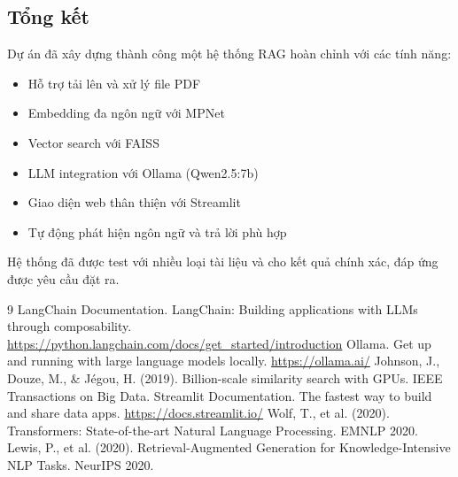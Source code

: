 \documentclass[a4paper]{article}
\begin{document}
\subsection{ Tổng kết}
Dự án đã xây dựng thành công một hệ thống RAG hoàn chỉnh với các tính năng:
\begin{itemize}
    \item Hỗ trợ tải lên và xử lý file PDF
    \item Embedding đa ngôn ngữ với MPNet
    \item Vector search với FAISS
    \item LLM integration với Ollama (Qwen2.5:7b)
    \item Giao diện web thân thiện với Streamlit
    \item Tự động phát hiện ngôn ngữ và trả lời phù hợp
\end{itemize}
Hệ thống đã được test với nhiều loại tài liệu và cho kết quả chính xác, đáp ứng được yêu cầu đặt ra. %
\newpage
\begin{thebibliography}{9} %
     LangChain Documentation. LangChain: Building applications with LLMs through composability. \url{https://python.langchain.com/docs/get_started/introduction}
     Ollama. Get up and running with large language models locally. \url{https://ollama.ai/} %
     Johnson, J., Douze, M., \& Jégou, H. (2019). Billion-scale similarity search with GPUs. IEEE Transactions on Big Data. %
     Streamlit Documentation. The fastest way to build and share data apps. \url{https://docs.streamlit.io/} %
     Wolf, T., et al. (2020). Transformers: State-of-the-art Natural Language Processing. EMNLP 2020. %
     Lewis, P., et al. (2020). Retrieval-Augmented Generation for Knowledge-Intensive NLP Tasks. NeurIPS 2020. %
\end{thebibliography}
\end{document}
